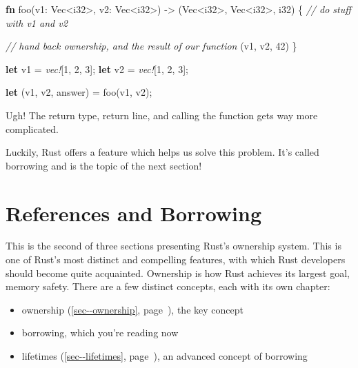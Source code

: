 \documentclass[a4paper,]{book}
\renewcommand*{\hypertarget}[3][\ar]{%
  \def\ar{#2}%
  \label{#1}%
  #3}
\renewcommand*{\hyperlink}[2]{%
 #2 (\autoref{#1}, page~\pageref{#1})}
\newenvironment{Shaded}{\begin{snugshade}}{\end{snugshade}}
\newcommand{\KeywordTok}[1]{\textcolor[rgb]{0.13,0.29,0.53}{\textbf{{#1}}}}
\newcommand{\DataTypeTok}[1]{\textcolor[rgb]{0.13,0.29,0.53}{{#1}}}
\newcommand{\DecValTok}[1]{\textcolor[rgb]{0.00,0.00,0.81}{{#1}}}
\newcommand{\CommentTok}[1]{\textcolor[rgb]{0.56,0.35,0.01}{\textit{{#1}}}}
\newcommand{\PreprocessorTok}[1]{\textcolor[rgb]{0.56,0.35,0.01}{\textit{{#1}}}}
\newcommand{\NormalTok}[1]{{#1}}
\providecommand{\tightlist}{%
  \setlength{\itemsep}{0pt}\setlength{\parskip}{0pt}}
\begin{document}
\begin{Shaded}
\begin{Highlighting}[]
\KeywordTok{fn} \NormalTok{foo(v1: }\DataTypeTok{Vec}\NormalTok{<}\DataTypeTok{i32}\NormalTok{>, v2: }\DataTypeTok{Vec}\NormalTok{<}\DataTypeTok{i32}\NormalTok{>) -> (}\DataTypeTok{Vec}\NormalTok{<}\DataTypeTok{i32}\NormalTok{>, }\DataTypeTok{Vec}\NormalTok{<}\DataTypeTok{i32}\NormalTok{>, }\DataTypeTok{i32}\NormalTok{) \{}
    \CommentTok{// do stuff with v1 and v2}

    \CommentTok{// hand back ownership, and the result of our function}
    \NormalTok{(v1, v2, }\DecValTok{42}\NormalTok{)}
\NormalTok{\}}

\KeywordTok{let} \NormalTok{v1 = }\PreprocessorTok{vec!}\NormalTok{[}\DecValTok{1}\NormalTok{, }\DecValTok{2}\NormalTok{, }\DecValTok{3}\NormalTok{];}
\KeywordTok{let} \NormalTok{v2 = }\PreprocessorTok{vec!}\NormalTok{[}\DecValTok{1}\NormalTok{, }\DecValTok{2}\NormalTok{, }\DecValTok{3}\NormalTok{];}

\KeywordTok{let} \NormalTok{(v1, v2, answer) = foo(v1, v2);}
\end{Highlighting}
\end{Shaded}

Ugh! The return type, return line, and calling the function gets way
more complicated.

Luckily, Rust offers a feature which helps us solve this problem. It's
called borrowing and is the topic of the next section!

\hypertarget{sec--references-and-borrowing}{\section{References and
Borrowing}\label{sec--references-and-borrowing}}

This is the second of three sections presenting Rust's ownership system.
This is one of Rust's most distinct and compelling features, with which
Rust developers should become quite acquainted. Ownership is how Rust
achieves its largest goal, memory safety. There are a few distinct
concepts, each with its own chapter:

\begin{itemize}
\tightlist
\item
  \protect\hyperlink{sec--ownership}{ownership}, the key concept
\item
  borrowing, which you're reading now
\item
  \protect\hyperlink{sec--lifetimes}{lifetimes}, an advanced concept of
  borrowing
\end{itemize}
\end{document}
